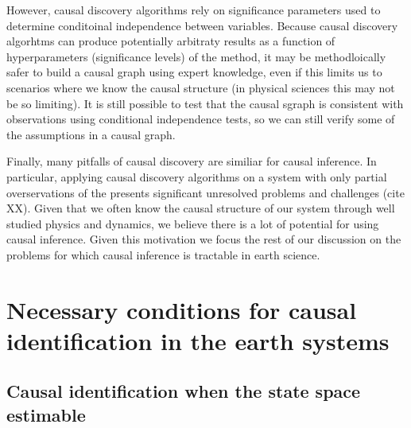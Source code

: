 \documentclass[12pt]{article}
\begin{document}
However, causal discovery algorithms rely on significance
parameters used to determine conditoinal independence between
variables. Because causal discovery algorhtms can produce
potentially arbitraty results as a function of hyperparameters
(significance levels) of the method, it may be methodloically
safer to build a causal graph using expert knowledge, even if this
limits us to scenarios where we know the causal structure (in
physical sciences this may not be so limiting). It is still
possible to test that the causal sgraph is consistent with
observations using conditional independence tests, so we can still
verify some of the assumptions in a causal graph.


Finally, many pitfalls of causal discovery are similiar for causal
inference. In particular, applying causal discovery algorithms on
a system with only partial overservations of the presents
significant unresolved problems and challenges (cite XX). Given
that we often know the causal structure of our system through well
studied physics and dynamics, we believe there is a lot of
potential for using causal inference. Given this motivation we
focus the rest of our discussion on the problems for which causal
inference is tractable in earth science.


\section{Necessary conditions for causal identification in the earth
  systems}
\label{sec:necess-cond-caus}
\subsection{Causal identification when the state space estimable}
\label{state-space}


\end{document}
